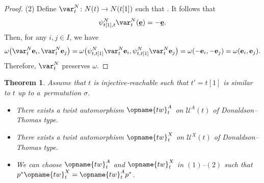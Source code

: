\documentclass[pdftex]{sigma}
\renewcommand{\tw}{\opname{tw}}
\newcommand{\upClAlg}{\mathcal{U}^A}
\newcommand{\XClAlg}{\mathcal{U}^X}
\newcommand{\Id}{{\opname{Id}}}
\renewcommand{\tw}{\opname{tw}}
\newcommand{\ee}{\mathbf{e}}
\newcommand{\uee}{\underline{\ee}}
\newcommand{\high}{\opname{\ufv,\fv}}
\numberwithin{equation}{section}
\newtheorem{Theorem}{Theorem}[section]
\begin{document}
\begin{proof}
(2) Define $\var_{t}^{N}\colon N(t)\rightarrow N(t[1])$ such that \smash{$\var_{t}^{N}(\uee)=\uee'\left(\begin{smallmatrix}
\Id_{\ufv} & -E_{\high}\\
0 & -\Id_{\fv}
\end{smallmatrix}\right)$}. It follows that \[\psi_{t[1],t}^{N}\var_{t}^{N}(\uee)=-\uee.\] Then,
for any $i,j\in I$, we have
\begin{gather*}
\omega\bigl(\var_{t}^{N}\ee_{i},\var_{t}^{N}\ee_{j}\bigr) =\omega\big(\psi_{t,t[1]}^{N}\var_{t}^{N}\ee_{i},\psi_{t,t[1]}^{N}\var_{t}^{N}\ee_{j}\big) =\omega(-\ee_{i},-\ee_{j})=\omega(\ee_{i},\ee_{j}).
\end{gather*}
Therefore, $\var_{t}^{N}$ preserves $\omega$.
\end{proof}

\begin{Theorem}\label{thm:twist_DT}
Assume that $t$ is injective-reachable such that $t'=t[1]$ is similar
to $t$ up to a~permutation $\sigma$.
\begin{itemize}\itemsep=0pt
\item[$(1)$] There exists a twist automorphism $\tw_{t}^{A}$ on $\upClAlg(t)$
of Donaldson--Thomas type.
\item[$(2)$] There exists a twist automorphism $\tw_{t}^{X}$ on $\XClAlg(t)$
of Donaldson--Thomas type.
\item[$(3)$] We can choose $\tw_{t}^{A}$ and $\tw_{t}^{X}$ in $(1)$--$(2)$ such that $p^{*}\tw_{t}^{X}=\tw_{t}^{A}p^{*}$.
\end{itemize}
\end{Theorem}
\end{document}
